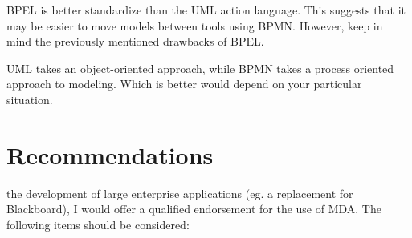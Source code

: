 \documentclass[10pt,journal,letterpaper,compsoc]{IEEEtran}
\begin{document}
BPEL\cite{BPMN20} is better standardize than the UML action language\cite{Mellor2007}.  This suggests that it may be easier to move models between tools using BPMN.  However, keep in mind the previously mentioned drawbacks of BPEL.

UML takes an object-oriented approach, while BPMN takes a process oriented approach to modeling\cite{BPMNFaq2011}.  Which is better would depend on your particular situation.

\section{Recommendations}
 the development of large enterprise applications (eg. a replacement for Blackboard), I would offer a qualified endorsement for the use of MDA.  The following items should be considered:
\end{document}
